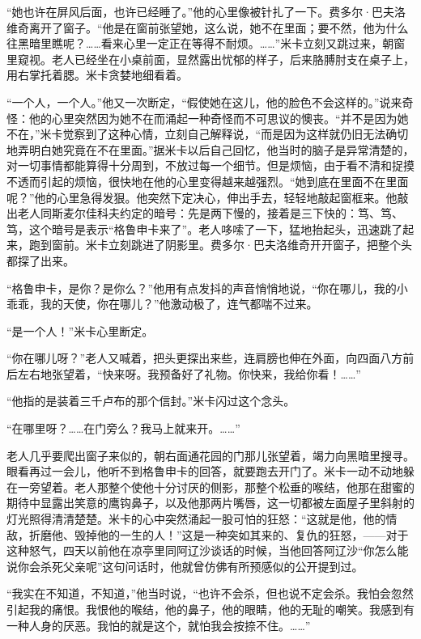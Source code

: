 \par “她也许在屏风后面，也许已经睡了。”他的心里像被针扎了一下。费多尔·巴夫洛维奇离开了窗子。“他是在窗前张望她，这么说，她不在里面；要不然，他为什么往黑暗里瞧呢？……看来心里一定正在等得不耐烦。……”米卡立刻又跳过来，朝窗里窥视。老人已经坐在小桌前面，显然露出忧郁的样子，后来胳膊肘支在桌子上，用右掌托着腮。米卡贪婪地细看着。
\par “一个人，一个人。”他又一次断定，“假使她在这儿，他的脸色不会这样的。”说来奇怪：他的心里突然因为她不在而涌起一种奇怪而不可思议的懊丧。“并不是因为她不在，”米卡觉察到了这种心情，立刻自己解释说，“而是因为这样就仍旧无法确切地弄明白她究竟在不在里面。”据米卡以后自己回忆，他当时的脑子是异常清楚的，对一切事情都能算得十分周到，不放过每一个细节。但是烦恼，由于看不清和捉摸不透而引起的烦恼，很快地在他的心里变得越来越强烈。“她到底在里面不在里面呢？”他的心里急得发狠。他突然下定决心，伸出手去，轻轻地敲起窗框来。他敲出老人同斯麦尔佳科夫约定的暗号：先是两下慢的，接着是三下快的：笃、笃、笃，这个暗号是表示“格鲁申卡来了”。老人哆嗦了一下，猛地抬起头，迅速跳了起来，跑到窗前。米卡立刻跳进了阴影里。费多尔·巴夫洛维奇开开窗子，把整个头都探了出来。
\par “格鲁申卡，是你？是你么？”他用有点发抖的声音悄悄地说，“你在哪儿，我的小乖乖，我的天使，你在哪儿？”他激动极了，连气都喘不过来。
\par “是一个人！”米卡心里断定。
\par “你在哪儿呀？”老人又喊着，把头更探出来些，连肩膀也伸在外面，向四面八方前后左右地张望着，“快来呀。我预备好了礼物。你快来，我给你看！……”
\par “他指的是装着三千卢布的那个信封。”米卡闪过这个念头。
\par “在哪里呀？……在门旁么？我马上就来开。……”
\par 老人几乎要爬出窗子来似的，朝右面通花园的门那儿张望着，竭力向黑暗里搜寻。眼看再过一会儿，他听不到格鲁申卡的回答，就要跑去开门了。米卡一动不动地躲在一旁望着。老人那整个使他十分讨厌的侧影，那整个松垂的喉结，他那在甜蜜的期待中显露出笑意的鹰钩鼻子，以及他那两片嘴唇，这一切都被左面屋子里斜射的灯光照得清清楚楚。米卡的心中突然涌起一股可怕的狂怒：“这就是他，他的情敌，折磨他、毁掉他的一生的人！”这是一种突如其来的、复仇的狂怒，——对于这种怒气，四天以前他在凉亭里同阿辽沙谈话的时候，当他回答阿辽沙“你怎么能说你会杀死父亲呢”这句问话时，他就曾仿佛有所预感似的公开提到过。
\par “我实在不知道，不知道，”他当时说，“也许不会杀，但也说不定会杀。我怕会忽然引起我的痛恨。我恨他的喉结，他的鼻子，他的眼睛，他的无耻的嘲笑。我感到有一种人身的厌恶。我怕的就是这个，就怕我会按捺不住。……”
